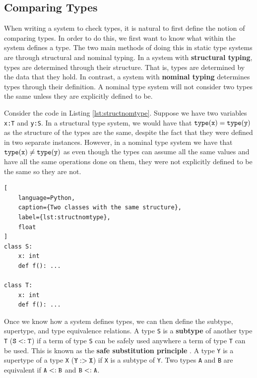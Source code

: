 \documentclass[10pt,twocolumn]{article}
\begin{document}
\subsection{Comparing Types}


When writing a system to check types, it is natural to first define the notion of comparing types. In order to do this, we first want to know what within the system defines a type. The two main methods of doing this in static type systems are through structural and nominal typing. In a system with \textbf{structural typing}, types are determined through their structure. That is, types are determined by the data that they hold. In contrast, a system with \textbf{nominal typing} determines types through their definition. A nominal type system will not consider two types the same unless they are explicitly defined to be. 

Consider the code in Listing \ref{lst:structnomtype}. Suppose we have two variables \verb|x:T| and \verb|y:S|. In a structural type system, we would have that $\verb|type|(\verb|x|) = \verb|type|(\verb|y|)$ as the structure of the types are the same, despite the fact that they were defined in two separate instances. However, in a nominal type system we have that $\verb|type|(\verb|x|) \neq \verb|type|(\verb|y|)$ as even though the types can assume all the same values and have all the same operations done on them, they were not explicitly defined to be the same so they are not.
\begin{lstlisting}[
    language=Python,
    caption={Two classes with the same structure},
    label={lst:structnomtype},
    float
]
class S:
    x: int
    def f(): ...

class T:
    x: int
    def f(): ...
\end{lstlisting}

Once we know how a system defines types, we can then define the subtype, supertype, and type equivalence relations. A type \verb|S| is a \textbf{subtype} of another type \verb|T| ($\verb|S| <: \verb|T|$) if a term of type \verb|S| can be safely used anywhere a term of type \verb|T| can be used. This is known as the \textbf{safe substitution principle} \cite{Pierce:SF2Subtyping}. A type \verb|Y| is a supertype of a type \verb|X| ($\verb|Y| :> \verb|X|$) if \verb|X| is a subtype of \verb|Y|. Two types \verb|A| and \verb|B| are equivalent if $\verb|A| <: \verb|B|$ and $\verb|B| <: \verb|A|$.
\end{document}
